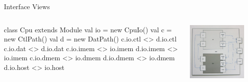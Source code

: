 \documentclass[xcolor=pdflatex,dvipsnames,table]{beamer}
\begin{document}
\begin{frame}[fragile]{Interface Views}
\begin{columns}

\begin{scala}
class Cpu extends Module {
  val io = new CpuIo()
  val c  = new CtlPath()
  val d  = new DatPath()
  c.io.ctl  <> d.io.ctl
  c.io.dat  <> d.io.dat
  c.io.imem <> io.imem
  d.io.imem <> io.imem
  c.io.dmem <> io.dmem
  d.io.dmem <> io.dmem
  d.io.host <> io.host
}
\end{scala}


\begin{center}
\includegraphics[width=0.9\textwidth]{../tutfigs/cpu.png} 
\end{center}

\end{columns}
\end{frame}
\end{document}
